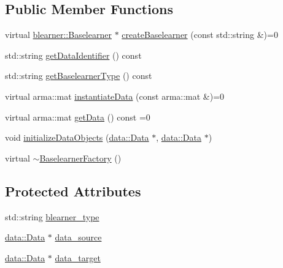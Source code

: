 \subsection*{Public Member Functions}
\begin{DoxyCompactItemize}
\item 
virtual \mbox{\hyperlink{classblearner_1_1_baselearner}{blearner\+::\+Baselearner}} $\ast$ \mbox{\hyperlink{classblearnerfactory_1_1_baselearner_factory_ac3584a20a84834099a15908690b837bb}{create\+Baselearner}} (const std\+::string \&)=0
\item 
std\+::string \mbox{\hyperlink{classblearnerfactory_1_1_baselearner_factory_a40703963bb3fd273b835a99263d9b599}{get\+Data\+Identifier}} () const
\item 
std\+::string \mbox{\hyperlink{classblearnerfactory_1_1_baselearner_factory_a05d5c00f7a434548868c4ad21d0f5fda}{get\+Baselearner\+Type}} () const
\item 
virtual arma\+::mat \mbox{\hyperlink{classblearnerfactory_1_1_baselearner_factory_ac4a38c4815fb33b8d4785745117c5e57}{instantiate\+Data}} (const arma\+::mat \&)=0
\item 
virtual arma\+::mat \mbox{\hyperlink{classblearnerfactory_1_1_baselearner_factory_aa3e4580bca870ca3b742dda6c820e1e6}{get\+Data}} () const =0
\item 
void \mbox{\hyperlink{classblearnerfactory_1_1_baselearner_factory_a147d4ef123ec382fe402d562a91df4d2}{initialize\+Data\+Objects}} (\mbox{\hyperlink{classdata_1_1_data}{data\+::\+Data}} $\ast$, \mbox{\hyperlink{classdata_1_1_data}{data\+::\+Data}} $\ast$)
\item 
virtual \mbox{\hyperlink{classblearnerfactory_1_1_baselearner_factory_adc9d1d3c8fc774c9d856117632c8aadb}{$\sim$\+Baselearner\+Factory}} ()
\end{DoxyCompactItemize}
\subsection*{Protected Attributes}
\begin{DoxyCompactItemize}
\item 
std\+::string \mbox{\hyperlink{classblearnerfactory_1_1_baselearner_factory_a3382b7d9833484f63755a26447a5d2e4}{blearner\+\_\+type}}
\item 
\mbox{\hyperlink{classdata_1_1_data}{data\+::\+Data}} $\ast$ \mbox{\hyperlink{classblearnerfactory_1_1_baselearner_factory_a6194191695958b4035d3ea0841c2320c}{data\+\_\+source}}
\item 
\mbox{\hyperlink{classdata_1_1_data}{data\+::\+Data}} $\ast$ \mbox{\hyperlink{classblearnerfactory_1_1_baselearner_factory_af2cb5c226c90469c6a70b677214ecc2f}{data\+\_\+target}}
\end{DoxyCompactItemize}


